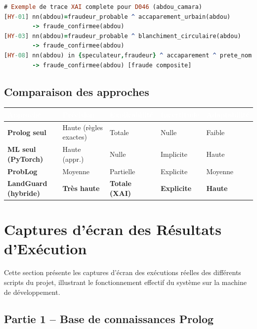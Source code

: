 \documentclass[11pt,a4paper]{report}
\begin{document}
\begin{lstlisting}[language=Prolog]
# Exemple de trace XAI complete pour D046 (abdou_camara)
[HY-01] nn(abdou)=fraudeur_probable ^ accaparement_urbain(abdou)
        -> fraude_confirmee(abdou)
[HY-03] nn(abdou)=fraudeur_probable ^ blanchiment_circulaire(abdou)
        -> fraude_confirmee(abdou)
[HY-08] nn(abdou) in {speculateur,fraudeur} ^ accaparement ^ prete_nom
        -> fraude_confirmee(abdou) [fraude composite]
\end{lstlisting}

\section{Comparaison des approches}

\begin{center}
\begin{tabular}{>{\bfseries}p{3.5cm} p{2.8cm} p{2.8cm} p{2.5cm} p{2.8cm}}
\toprule
\rowcolor{tablehead}\textcolor{white}{Approche} & \textcolor{white}{Précision} & \textcolor{white}{Explicabilité} & \textcolor{white}{Incertitude} & \textcolor{white}{Adaptabilité} \\
\midrule
Prolog seul        & Haute (règles exactes) & Totale     & Nulle     & Faible \\
ML seul (PyTorch)  & Haute (appr.)          & Nulle      & Implicite & Haute \\
ProbLog            & Moyenne                & Partielle  & Explicite & Moyenne \\
\rowcolor{green!10}\textbf{LandGuard (hybride)} & \textbf{Très haute} & \textbf{Totale (XAI)} & \textbf{Explicite} & \textbf{Haute} \\
\bottomrule
\end{tabular}
\end{center}

\chapter*{Captures d'\'ecran des R\'esultats d'Ex\'ecution}
 
Cette section pr\'esente les captures d'\'ecran des ex\'ecutions r\'eelles des
diff\'erents scripts du projet, illustrant le fonctionnement effectif du
syst\`eme sur la machine de d\'eveloppement.
 
\section{Partie 1 -- Base de connaissances Prolog}
 
\end{document}

